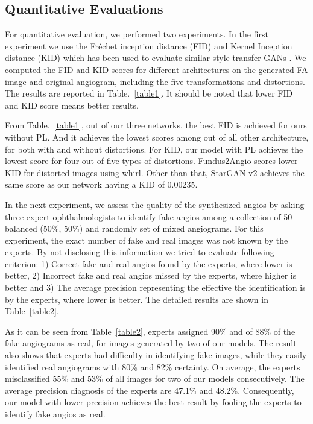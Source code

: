 \documentclass[a4paper,conference]{IEEEtran}
\begin{document}
\subsection{Quantitative Evaluations}
\label{subsec:quant}
For quantitative evaluation, we performed two experiments. In the first experiment we use the Fréchet inception distance (FID) \cite{heusel2017gans} and Kernel Inception distance (KID) \cite{binkowski2018demystifying} which has been used to evaluate similar style-transfer GANs \cite{choi2020stargan,kim2019u}. We computed the FID and KID scores for different architectures on the generated FA image and original angiogram, including the five transformations and distortions. The results are reported in Table.~\ref{table1}. It should be noted that lower FID and KID score means better results. 

From Table.~\ref{table1},  out of our three networks, the best FID is achieved for ours without PL.  And it achieves the lowest scores among out of all other architecture, for both with and without distortions. For KID, our model with PL achieves the lowest score for four out of five types of distortions. Fundus2Angio scores lower KID for distorted images using whirl. Other than that, StarGAN-v2 achieves the same score as our network having a KID of 0.00235.



In the next experiment, we assess the quality of the synthesized angios by asking three expert ophthalmologists to identify fake angios among a collection of 50 balanced (50\%, 50\%) and randomly set of mixed angiograms. For this experiment, the exact number of fake and real images was not known by the experts. By not disclosing this information we tried to evaluate following criterion: 1) Correct fake and real angios found by the experts, where lower is better, 2) Incorrect fake and real angios missed by the experts, where higher is better and 3) The average precision representing the effective the identification is by the experts, where lower is better. The detailed results are shown in Table~\ref{table2}.

As it can be seen from Table~\ref{table2}, experts assigned 90\% and of 88\% of the fake angiograms as real, for images generated by two of our models. The result also shows that experts had difficulty in identifying fake images, while they easily identified real angiograms with 80\% and 82\% certainty. On average, the experts misclassified 55\% and 53\% of all images for two of our models consecutively. The average precision diagnosis of the experts are 47.1\% and 48.2\%. Consequently, our model with lower precision achieves the best result by fooling the experts to identify fake angios as real.
\end{document}
